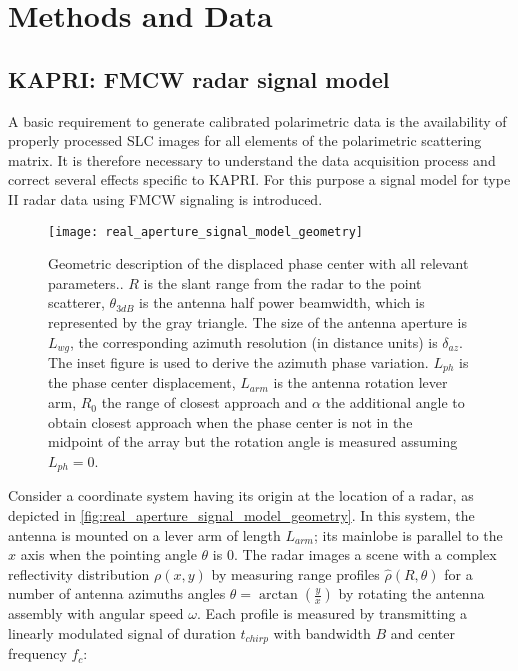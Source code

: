 \section{Methods and Data}\label{sec:methods}
\subsection{KAPRI: FMCW radar signal model}\label{sec:methods:signal_model}
A basic requirement to generate calibrated polarimetric data is the availability of properly processed SLC images for all elements of the polarimetric scattering matrix. It is therefore necessary to understand the data acquisition process and correct several effects specific to KAPRI.  
For this purpose a signal model for type II\cite{Caduff2015} radar data using FMCW signaling\cite{Stove1992} is introduced.\\
\begin{figure}[h]
	\centering
	\texttt{[image: real\_aperture\_signal\_model\_geometry]}
	\caption{Geometric description of the displaced phase center with all relevant parameters.. $R$ is the slant range from the radar to the point scatterer, $\theta_{3dB}$ is the antenna half power beamwidth, which is represented by the gray triangle. The size of the antenna aperture is $L_{wg}$, the corresponding azimuth resolution (in distance units) is $\delta_{az}$. The inset figure is used to derive the azimuth phase variation. $L_{ph}$ is the phase center displacement, $L_{arm}$ is the antenna rotation lever arm, $R_{0}$ the range of closest approach and $\alpha$ the additional angle to obtain closest approach when the phase center is not in the midpoint of the array but the rotation angle is measured assuming $L_{ph}=0$.}
	\label{fig:real_aperture_signal_model_geometry}
\end{figure}
Consider a coordinate system having its origin at the location of a radar, as depicted in \autoref{fig:real_aperture_signal_model_geometry}. In this system, the antenna is mounted on a lever arm of length $L_{arm}$; its mainlobe is parallel to the $x$ axis when the pointing angle $\theta$ is 0. The radar images a scene with a complex reflectivity distribution $\rho\left(x,y\right)$ by measuring range profiles $\hat{\rho}\left(R, \theta\right)$ for a number of antenna azimuths angles $\theta = \operatorname{arctan}\left(\frac{y}{x}\right)$ by rotating the antenna assembly with angular speed $\omega$. Each profile is measured by transmitting a linearly modulated signal of duration $t_{chirp}$ with bandwidth $B$ and center frequency $f_c$:
